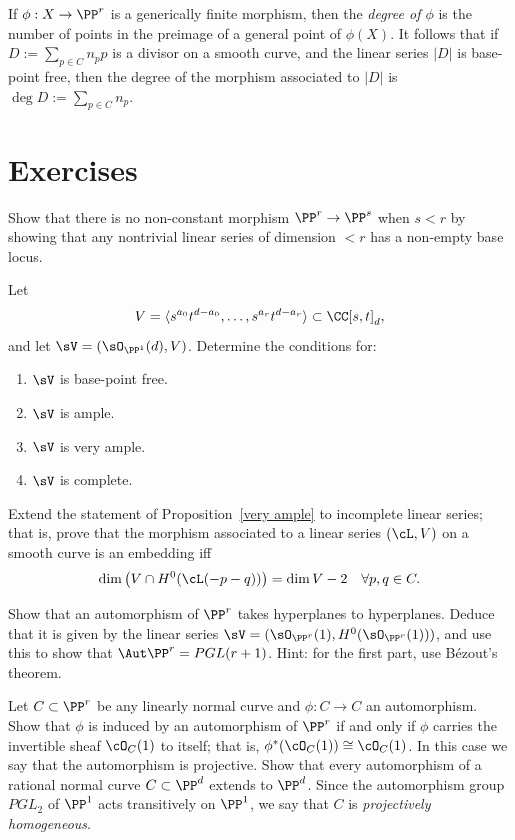If $\phi:X \to \PP^r$ is a generically finite morphism, then the \emph{degree of $\phi$} is the number of points in the preimage of a general point of $\phi(X)$. It follows that if $D := \sum_{p\in C} n_pp$ is a divisor on a smooth curve, and the linear series $|D|$ is base-point free, then the degree of the morphism associated to $|D|$ is $\deg D := \sum_{p\in C} n_p$.

\section{Exercises}

\begin{exercise}\label{here there be basepoints}
 Show that there is no non-constant morphism $\PP^r\to \PP^s$ when $s<r$ by showing that any nontrivial linear
 series of dimension $<r$ has a non-empty base locus.
\end{exercise}

\begin{exercise}
Let 
$$
V = \langle s^{a_0}t^{d-a_0}, \dots, s^{a_r}t^{d-a_r}\rangle \subset \CC[s,t]_d,
$$
and let $\sV = (\sO_{\PP^1}(d), V)$. Determine the conditions for:
\begin{enumerate}
 \item $\sV$ is base-point free.
 \item $\sV$ is ample.
 \item $\sV$ is very ample.
 \item $\sV$ is complete.
\end{enumerate}
\end{exercise}

\begin{exercise}
Extend the statement of Proposition~\ref{very ample} to incomplete linear series; that is, prove that the morphism associated to a linear series $(\cL, V)$
on a smooth curve is an embedding iff
$$
\dim\big( V \cap H^0(\cL(-p-q))\big) = \dim V - 2 \quad \forall p, q \in C.
$$
\end{exercise}

\begin{exercise}\label{aut Pr}
Show that an automorphism of $\PP^r$ takes hyperplanes to hyperplanes. Deduce that it is given by the linear series
$\sV = (\sO_{\PP^r}(1), H^0(\sO_{\PP^r}(1)))$, and use this to show that $\Aut \PP^r = PGL(r+1)$. Hint: for the first part, use B\'ezout's theorem.
\end{exercise}

\begin{exercise}\label{projective automorphism}
Let $C \subset \PP^r$ be any linearly normal curve and $\phi: C \to C$ an automorphism. Show that $\phi$ is induced by an automorphism of $\PP^r$ if and only if $\phi$ carries the invertible sheaf $\cO_{C}(1)$ to itself; that is, $\phi^*(\cO_{C}(1)) \cong \cO_{C}(1)$. In this case we say that the automorphism
is projective. Show that every automorphism of a rational normal curve $C \subset \PP^d$  extends to $\PP^d$. Since the
automorphism group $PGL_2$ of $\PP^1$ acts transitively on $\PP^1$, we say that
$C$ is \emph{projectively homogeneous}.
\end{exercise}

